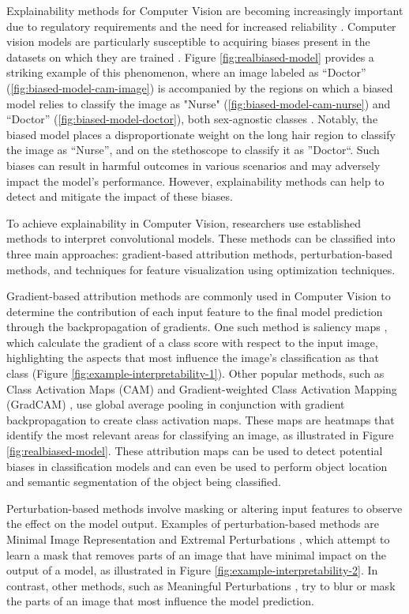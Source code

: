Explainability methods for Computer Vision are becoming increasingly important due to regulatory requirements and the need for increased reliability \cite{Gerlings2020ReviewingTN}. Computer vision models are particularly susceptible to acquiring biases present in the datasets on which they are trained \cite{Kirill2022, GeirhosRMBWB19}. Figure \ref{fig:realbiased-model} provides a striking example of this phenomenon, where an image labeled as ``Doctor'' (\ref{fig:biased-model-cam-image}) is accompanied by the regions on which a biased model relies to classify the image as "Nurse" (\ref{fig:biased-model-cam-nurse}) and ``Doctor'' (\ref{fig:biased-model-doctor}), both sex-agnostic classes \cite{gradcam}. Notably, the biased model places a disproportionate weight on the long hair region to classify the image as ``Nurse'', and on the stethoscope to classify it as ''Doctor``. Such biases can result in harmful outcomes in various scenarios and may adversely impact the model's performance. However, explainability methods can help to detect and mitigate the impact of these biases.

To achieve explainability in Computer Vision, researchers use established methods to interpret convolutional models. These methods can be classified into three main approaches: gradient-based attribution methods, perturbation-based methods, and techniques for feature visualization using optimization techniques.

Gradient-based attribution methods are commonly used in Computer Vision to determine the contribution of each input feature to the final model prediction through the backpropagation of gradients. One such method is saliency maps \cite{Simonyan2013DeepIC}, which calculate the gradient of a class score with respect to the input image, highlighting the aspects that most influence the image's classification as that class (Figure \ref{fig:example-interpretability-1}). Other popular methods, such as Class Activation Maps (CAM) \cite{CAM} and Gradient-weighted Class Activation Mapping (GradCAM) \cite{gradcam}, use global average pooling in conjunction with gradient backpropagation to create class activation maps. These maps are heatmaps that identify the most relevant areas for classifying an image, as illustrated in Figure \ref{fig:realbiased-model}. These attribution maps can be used to detect potential biases in classification models and can even be used to perform object location and semantic segmentation of the object being classified.

Perturbation-based methods involve masking or altering input features to observe the effect on the model output. Examples of perturbation-based methods are Minimal Image Representation \cite{Zhou2014ObjectDE} and Extremal Perturbations \cite{Fong2019}, which attempt to learn a mask that removes parts of an image that have minimal impact on the output of a model, as illustrated in Figure \ref{fig:example-interpretability-2}. In contrast, other methods, such as Meaningful Perturbations \cite{Fong2017InterpretableEO}, try to blur or mask the parts of an image that most influence the model prediction.

